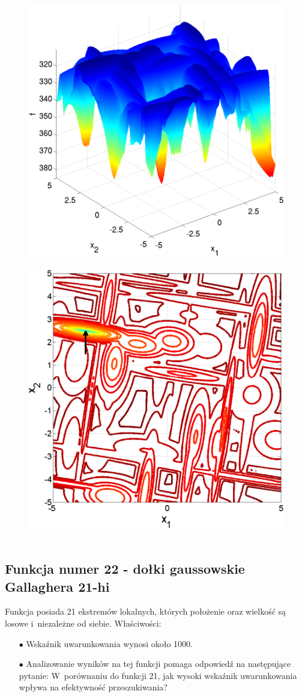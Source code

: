 \documentclass[a4paper,onecolumn,oneside,11pt,wide,floatssmall]{mwrep}
\theoremstyle{definition}
\theoremstyle{plain}%
\theoremstyle{remark}
\begin{document}
\begin{figure}[H]
\centering
\mbox{
\includegraphics[width=.45\textwidth]{img/21.png} \quad
\includegraphics[width=.45\textwidth]{img/21a.png} 
}
\end{figure}

\subsection{Funkcja numer 22 - dołki gaussowskie Gallaghera 21-hi}

Funkcja posiada 21 ekstremów lokalnych, których położenie oraz wielkość są losowe i~niezależne od siebie.
Właściwości:
\begin{itemize}
 \item[$\bullet$] Wskaźnik uwarunkowania wynosi około 1000.
 \item[$\bullet$] Analizowanie wyników na tej funkcji pomaga odpowiedź na następujące pytanie: W~porównaniu do funkcji 21, jak 
wysoki wskaźnik uwarunkowania wpływa na efektywność przeszukiwania?
\end{itemize} 
\end{document}
